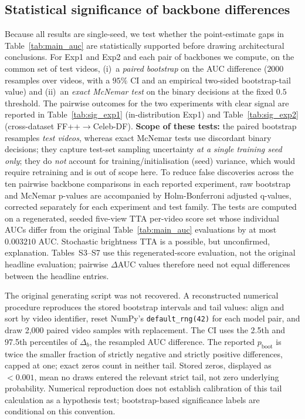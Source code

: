\subsection{Statistical significance of backbone differences}
Because all results are single-seed, we test whether the point-estimate gaps in Table~\ref{tab:main_auc} are statistically supported before drawing architectural conclusions. For Exp1 and Exp2 and each pair of backbones we compute, on the common set of test videos, (i)~a \emph{paired bootstrap} on the AUC difference ($2000$ resamples over videos, with a $95\%$ CI and an empirical two-sided bootstrap-tail value) and (ii)~an \emph{exact McNemar test} on the binary decisions at the fixed $0.5$ threshold. The pairwise outcomes for the two experiments with clear signal are reported in Table~\ref{tab:sig_exp1} (in-distribution Exp1) and Table~\ref{tab:sig_exp2} (cross-dataset FF++$\to$Celeb-DF). \textbf{Scope of these tests:} the paired bootstrap resamples \emph{test videos}, whereas exact McNemar tests use discordant binary decisions; they capture test-set sampling uncertainty \emph{at a single training seed only}; they do \emph{not} account for training/initialisation (seed) variance, which would require retraining and is out of scope here. To reduce false discoveries across the ten pairwise backbone comparisons in each reported experiment, raw bootstrap and McNemar p-values are accompanied by Holm-Bonferroni adjusted q-values, corrected separately for each experiment and test family. The tests are computed on a regenerated, seeded five-view TTA per-video score set whose individual AUCs differ from the original Table~\ref{tab:main_auc} evaluations by at most $0.003210$ AUC. Stochastic brightness TTA is a possible, but unconfirmed, explanation. Tables~S3--S7 use this regenerated-score evaluation, not the original headline evaluation; pairwise $\Delta$AUC values therefore need not equal differences between the headline entries.

The original generating script was not recovered. A reconstructed numerical procedure reproduces the stored bootstrap intervals and tail values: align and sort by video identifier, reset NumPy's \texttt{default\_rng(42)} for each model pair, and draw 2,000 paired video samples with replacement. The CI uses the 2.5th and 97.5th percentiles of $\Delta_b$, the resampled AUC difference. The reported $p_{\mathrm{boot}}$ is twice the smaller fraction of strictly negative and strictly positive differences, capped at one; exact zeros count in neither tail. Stored zeros, displayed as $<0.001$, mean no draws entered the relevant strict tail, not zero underlying probability. Numerical reproduction does not establish calibration of this tail calculation as a hypothesis test; bootstrap-based significance labels are conditional on this convention.


